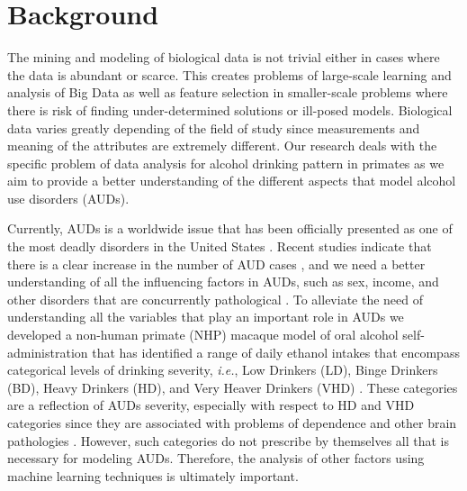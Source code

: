 \documentclass{bmcart}
\begin{document}


\section*{Background}

The mining and modeling of biological data is not trivial either in cases
where the data is abundant or scarce. This creates problems of large-scale learning
and analysis of Big Data as well as feature selection in smaller-scale problems
where there is risk of finding under-determined solutions or ill-posed models.
Biological data varies greatly depending of the field of study since
measurements and meaning of the attributes are extremely different. Our
research deals with the specific problem of data analysis for alcohol drinking
pattern in primates as we aim to provide a better understanding of the
different aspects that model alcohol use disorders (AUDs).

Currently, AUDs is a worldwide issue that has been officially presented as 
one of the most deadly disorders
in the United States \cite{mokdad2004actual}. Recent studies indicate that
there is a clear increase in the number of AUD cases
\cite{grant2004prevalence}, and we need a better understanding of all the
influencing factors in AUDs, such as sex, income, and other disorders that are
concurrently pathological \cite{grant2015epidemiology}. To alleviate the need of
understanding all the variables that play an important role in AUDs we
developed a non-human primate (NHP) 
macaque model of oral alcohol self-administration that has identified 
a range of daily ethanol intakes that encompass categorical levels 
of drinking severity, \emph{i.e.}, Low Drinkers (LD), Binge Drinkers 
(BD), Heavy Drinkers (HD), and Very Heaver Drinkers (VHD)
\cite{baker2014chronic}. These categories are a reflection of AUDs severity, especially
with respect to HD and VHD categories since they are associated with problems
of dependence and other brain pathologies
\cite{kroenke2014monkeys,chen2011striatal,siciliano2015voluntary}. However,
such categories do not prescribe by themselves all that is necessary for
modeling AUDs. Therefore, the analysis of other factors using machine learning
techniques is ultimately important.
\end{document}
